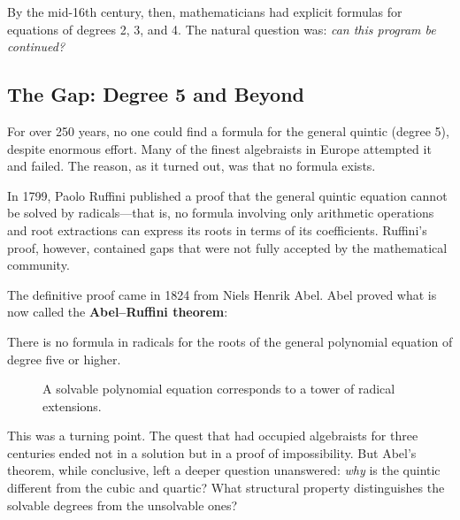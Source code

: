 By the mid-16th century, then, mathematicians had explicit formulas for equations of degrees 2, 3, and 4. The natural question was: \emph{can this program be continued?}

\subsection{The Gap: Degree 5 and Beyond}

For over 250 years, no one could find a formula for the general quintic (degree 5), despite enormous effort. Many of the finest algebraists in Europe attempted it and failed. The reason, as it turned out, was that no formula exists.

In 1799, Paolo Ruffini published a proof that the general quintic equation cannot be solved by radicals---that is, no formula involving only arithmetic operations and root extractions can express its roots in terms of its coefficients. Ruffini's proof, however, contained gaps that were not fully accepted by the mathematical community.

The definitive proof came in 1824 from Niels Henrik Abel. Abel proved what is now called the \textbf{Abel--Ruffini theorem}:

\begin{theorem}\label{thm:abel-ruffini}
There is no formula in radicals for the roots of the general polynomial equation of degree five or higher.
\end{theorem}

\begin{figure}[htbp]
\centering
{}
\caption{A solvable polynomial equation corresponds to a tower of radical extensions.}
\label{fig:solvable-tower}
\end{figure}

This was a turning point. The quest that had occupied algebraists for three centuries ended not in a solution but in a proof of impossibility. But Abel's theorem, while conclusive, left a deeper question unanswered: \emph{why} is the quintic different from the cubic and quartic? What structural property distinguishes the solvable degrees from the unsolvable ones?


